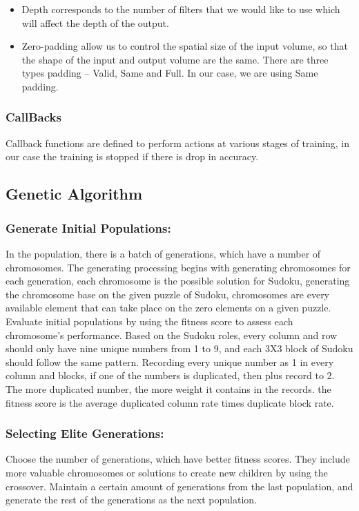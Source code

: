 \begin{itemize}
    \item Depth corresponds to the number of filters that we would like to use which will affect the depth of the output. 
    \item Zero-padding allow us to control the spatial size of the input volume, so that the shape of the input and output volume are the same. There are three types padding – Valid, Same and Full. In our case, we are using Same padding. 
\end{itemize}

\subsubsection{CallBacks}
Callback functions are defined to perform actions at various stages of training, in our case the training is stopped if there is drop in accuracy. 


\subsection{Genetic Algorithm}

\subsubsection{Generate Initial Populations:}
In the population, there is a batch of generations, which have a number of chromosomes.
The generating processing begins with generating chromosomes for each generation, each chromosome is the possible solution for Sudoku, generating the chromosome base on the given puzzle of Sudoku, chromosomes are every available element that can take place on the zero elements on a given puzzle. Evaluate initial populations by using the fitness score to assess each chromosome’s performance. Based on the Sudoku roles, every column and row should only have nine unique numbers from 1 to 9, and each 3X3 block of Sudoku should follow the same pattern. Recording every unique number as 1 in every column and blocks, if one of the numbers is duplicated, then plus record to 2. The more duplicated number, the more weight it contains in the records. the fitness score is the average duplicated column rate times duplicate block rate.

\subsubsection{Selecting Elite Generations:}
Choose the number of generations, which have better fitness scores. They include more valuable chromosomes or solutions to create new children by using the crossover. Maintain a certain amount of generations from the last population, and generate the rest of the generations as the next population. 

